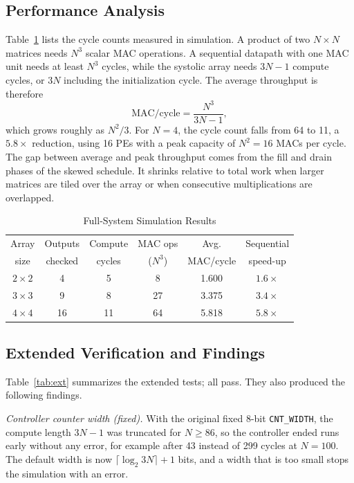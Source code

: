 \documentclass[conference]{IEEEtran}
\begin{document}
\subsection{Performance Analysis}
Table~\ref{tab:perf} lists the cycle counts measured in simulation. A product of two
$N\times N$ matrices needs $N^3$ scalar MAC operations. A sequential datapath with one MAC
unit needs at least $N^3$ cycles, while the systolic array needs $3N-1$ compute cycles, or
$3N$ including the initialization cycle. The average throughput is therefore
\begin{equation}
\text{MAC/cycle} = \frac{N^3}{3N-1},
\end{equation}
which grows roughly as $N^2/3$. For $N=4$, the cycle count falls from 64 to 11, a $5.8\times$
reduction, using 16 PEs with a peak capacity of $N^2=16$ MACs per cycle. The gap between
average and peak throughput comes from the fill and drain phases of the skewed schedule. It
shrinks relative to total work when larger matrices are tiled over the array or when
consecutive multiplications are overlapped.

\begin{table}[t]
\centering
\caption{Full-System Simulation Results}
\label{tab:perf}
\setlength{\tabcolsep}{4.5pt}
\begin{tabular}{@{}cccccc@{}}
\toprule
Array & Outputs & Compute & MAC ops & Avg. & Sequential\\
size & checked & cycles & ($N^3$) & MAC/cycle & speed-up\\
\midrule
$2\times2$ & 4 & 5 & 8 & 1.600 & $1.6\times$\\
$3\times3$ & 9 & 8 & 27 & 3.375 & $3.4\times$\\
$4\times4$ & 16 & 11 & 64 & 5.818 & $5.8\times$\\
\bottomrule
\end{tabular}
\end{table}

\subsection{Extended Verification and Findings}
Table~\ref{tab:ext} summarizes the extended tests; all pass. They also produced the following
findings.

\emph{Controller counter width (fixed).} With the original fixed 8-bit \texttt{CNT\_WIDTH},
the compute length $3N-1$ was truncated for $N\geq86$, so the controller ended runs early
without any error, for example after 43 instead of 299 cycles at $N=100$. The default width is
now $\lceil\log_2 3N\rceil+1$ bits, and a width that is too small stops the simulation with an
error.
\end{document}
